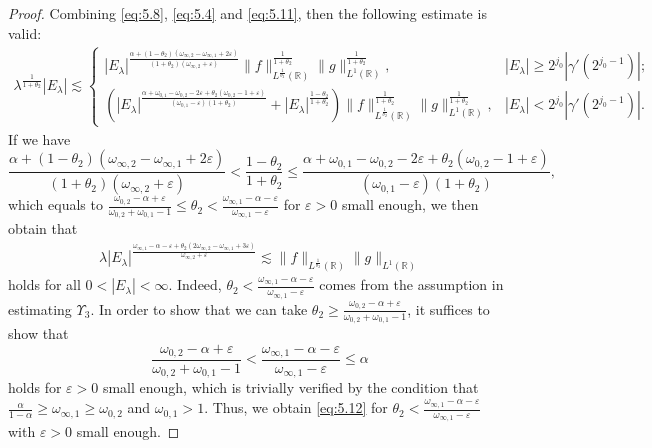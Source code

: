 \documentclass[11pt, twoside, leqno]{article}
\theoremstyle{definition}
\numberwithin{equation}{section}
\begin{document}
\begin{proof}
Combining \eqref{eq:5.8}, \eqref{eq:5.4} and \eqref{eq:5.11}, then the following estimate is valid:
\begin{align*}
\lambda^{\frac{1}{1+\theta_2}}|E_{\lambda}|\lesssim
\begin{cases}
   |E_\lambda|^{\frac{\alpha+(1-\theta_{2})(\omega_{\infty,2}-\omega_{\infty,1}+2\varepsilon)}{(1+\theta_{2})(\omega_{\infty,2}+\varepsilon)}}\|f\|^{\frac{1}{1+\theta_2}}_{L^{\frac{1}{\theta_2}}(\mathbb{R})}\|g\|^{\frac{1}{1+\theta_2}}_{L^{1}(\mathbb{R})}, & |E_\lambda|\geq2^{j_0}|\gamma'(2^{j_{0}-1})|;\\
\left(|E_\lambda|^{\frac{\alpha+\omega_{0,1}-\omega_{0,2}-2\varepsilon+\theta_{2}(\omega_{0,2}-1+\varepsilon)}{(\omega_{0,1}-\varepsilon)(1+\theta_{2})}}+|E_\lambda|^{\frac{1-\theta_2}{1+\theta_2}}\right)
\|f\|^{\frac{1}{1+\theta_2}}_{L^{\frac{1}{\theta_2}}(\mathbb{R})}\|g\|^{\frac{1}{1+\theta_2}}_{L^{1}(\mathbb{R})}, &|E_{\lambda}|<2^{j_0}|\gamma'(2^{j_{0}-1})|.
\end{cases}
\end{align*}
If we have $$\frac{\alpha+(1-\theta_{2})(\omega_{\infty,2}-\omega_{\infty,1}+2\varepsilon)}{(1+\theta_{2})(\omega_{\infty,2}+\varepsilon)}<
\frac{1-\theta_2}{1+\theta_2}\leq
\frac{\alpha+\omega_{0,1}-\omega_{0,2}-2\varepsilon+\theta_{2}(\omega_{0,2}-1+\varepsilon)}{(\omega_{0,1}-\varepsilon)(1+\theta_{2})},$$ which equals to
$\frac{\omega_{0,2}-\alpha+\varepsilon}{\omega_{0,2}+\omega_{0,1}-1}\leq\theta_2<\frac{\omega_{\infty,1}-\alpha-\varepsilon}{\omega_{\infty,1}-\varepsilon}$ for $\varepsilon>0$ small enough, we then obtain that
\begin{align}\label{eq:5.12}
\lambda|E_{\lambda}|^{\frac{\omega_{\infty,1}-\alpha-\varepsilon+ \theta_2(2\omega_{\infty,2}- \omega_{\infty,1} +3\varepsilon)}{\omega_{\infty,2}+\varepsilon}}\lesssim \|f\|_{L^{\frac{1}{\theta_2}}(\mathbb{R})}\|g\|_{L^{1}(\mathbb{R})}
\end{align}
holds for all $0<|E_\lambda|<\infty$. Indeed, $\theta_2<\frac{\omega_{\infty,1}-\alpha-\varepsilon}{\omega_{\infty,1}-\varepsilon}$ comes from the assumption in estimating $\Upsilon_{3}$. In order to show that we can take $\theta_2\geq\frac{\omega_{0,2}-\alpha+\varepsilon}{\omega_{0,2}+\omega_{0,1}-1}$, it suffices to show that $$\frac{\omega_{0,2}-\alpha+\varepsilon}{\omega_{0,2}+\omega_{0,1}-1}<\frac{\omega_{\infty,1}-\alpha-\varepsilon}{\omega_{\infty,1}-\varepsilon}\leq \alpha $$ holds for $\varepsilon>0$ small enough, which is trivially verified by the condition that $\frac{\alpha}{1-\alpha}\geq \omega_{\infty,1}\geq \omega_{0,2}$ and $\omega_{0,1}>1$. Thus, we obtain \eqref{eq:5.12} for $\theta_2<\frac{\omega_{\infty,1}-\alpha-\varepsilon}{\omega_{\infty,1}-\varepsilon}$ with $\varepsilon>0$ small enough.


\end{proof}
\end{document}
